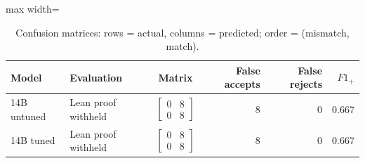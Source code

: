 \begin{table}[htbp]
\centering
\caption{Confusion matrices: rows = actual, columns = predicted; order = (mismatch, match).}
\label{tab:masked-control-confusion}
\small
\begin{adjustbox}{max width=\textwidth}
\begin{tabular}{llcrrr}
\toprule
Model & Evaluation & Matrix & False accepts & False rejects & $F1_+$ \\
\midrule
14B untuned & Lean proof withheld & $\left[\begin{array}{rr}0&8\\0&8\end{array}\right]$ & 8 & 0 & 0.667 \\
14B tuned & Lean proof withheld & $\left[\begin{array}{rr}0&8\\0&8\end{array}\right]$ & 8 & 0 & 0.667 \\
\bottomrule
\end{tabular}
\end{adjustbox}
\end{table}
